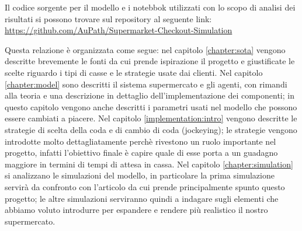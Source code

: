 Il codice sorgente per il modello e i notebbok utilizzati con lo scopo di analisi dei risultati si possono trovare sul repository al seguente link:
\url{https://github.com/AuPath/Supermarket-Checkout-Simulation}

Questa relazione è organizzata come segue: nel capitolo \ref{chapter:sota} vengono descritte brevemente le fonti da cui prende ispirazione il progetto e giustificate le scelte riguardo i tipi di casse e le strategie usate dai clienti. Nel capitolo \ref{chapter:model} sono descritti il sistema supermercato e gli agenti, con rimandi alla teoria e una descrizione in dettaglio dell'implementazione dei componenti; in questo capitolo vengono anche descritti i parametri usati nel modello che possono essere cambiati a piacere. Nel capitolo \ref{implementation:intro} vengono descritte le strategie di scelta della coda e di cambio di coda (jockeying); le strategie vengono introdotte molto dettagliatamente perchè rivestono un ruolo importante nel progetto, infatti l'obiettivo finale è capire quale di esse porta a un guadagno maggiore in termini di tempi di attesa in cassa. Nel capitolo \ref{chapter:simulation} si analizzano le simulazioni del modello, in particolare la prima simulazione servirà da confronto con l'articolo da cui prende principalmente spunto questo progetto; le altre simulazioni serviranno quindi a indagare sugli elementi che abbiamo voluto introdurre per espandere e rendere più realistico il nostro supermercato.
